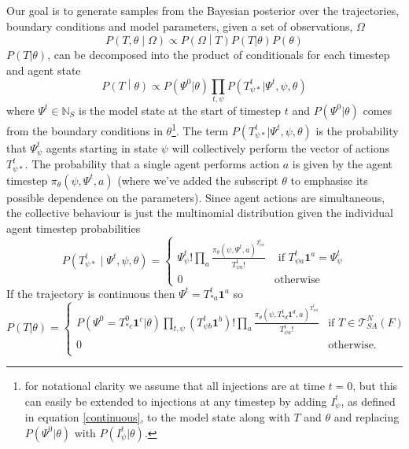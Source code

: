 \documentclass{article}
\begin{document}
Our goal is to generate samples from the Bayesian posterior over the trajectories, boundary conditions and model parameters, given a set of observations, $\Omega$
\[
P\left(T,\theta \middle| \Omega\right) \propto P\left(\Omega \middle| T\right)P(T|\theta)P(\theta)
\]
$P(T|\theta)$, can be decomposed into the product of conditionals for each timestep and agent state
\[
P\left(T \middle| \theta \right) \propto  P(\Psi^0|\theta) \prod_{t,\psi} P(T^t_{\psi *} | \Psi^t,\psi,\theta)
\]
where $\Psi^t\in\mathbb{N}_S$ is the model state at the start of timestep $t$ and $P(\Psi^0|\theta)$ comes from the boundary conditions in $\theta$\footnote{for notational clarity we assume that all injections are at time $t=0$, but this can easily be extended to injections at any timestep by adding $I^t_\psi$, as defined in equation \eqref{continuous}, to the model state along with $T$ and $\theta$ and replacing $P(\Psi^0|\theta)$ with $P(I^t_\psi|\theta)$.}.  The term $P(T^t_{\psi *} | \Psi^t,\psi,\theta)$ is the probability that $\Psi^t_\psi$ agents starting in state $\psi$ will collectively perform the vector of actions $T^t_{\psi *}$. The probability that a single agent performs action $a$ is given by the agent timestep $\pi_\theta(\psi,\Psi^t,a)$ (where we've added the subscript $\theta$ to emphasise its possible dependence on the parameters). Since agent actions are simultaneous, the collective behaviour is just the multinomial distribution given the individual agent timestep probabilities
\begin{equation}
P\left(T^t_{\psi *} \mid \Psi^t, \psi, \theta\right) = 
\begin{cases}
\Psi^t_\psi!\prod_a \frac{\pi_\theta(\psi,\Psi^t,a)^{T^t_{\psi a}}}{T^t_{\psi a}!} & \text{ if } T^t_{\psi a}\mathbf{1}^a = \Psi^t_\psi \\
0 & \text{otherwise}
\end{cases}
\end{equation}
If the trajectory is continuous then $\Psi^t = T^t_{* a}\mathbf{1}^a$ so 
\begin{equation}
P(T|\theta) =
\begin{cases}
P(\Psi^0 = T^0_{* c}\mathbf{1}^c|\theta)
\prod_{t, \psi} \left(T^t_{\psi b} \mathbf{1}^b \right)!
\prod_{a} \frac{\pi_\theta(\psi, T^{t}_{* d}\mathbf{1}^d,a)^{T^{t}_{\psi a}}}{T^{t}_{\psi a}!} & \text{if } T \in \mathcal{T}^N_{SA}(F) \\
0 & \text{otherwise.}\\
\end{cases}
\label{priorTrajectory}
\end{equation}
\end{document}
